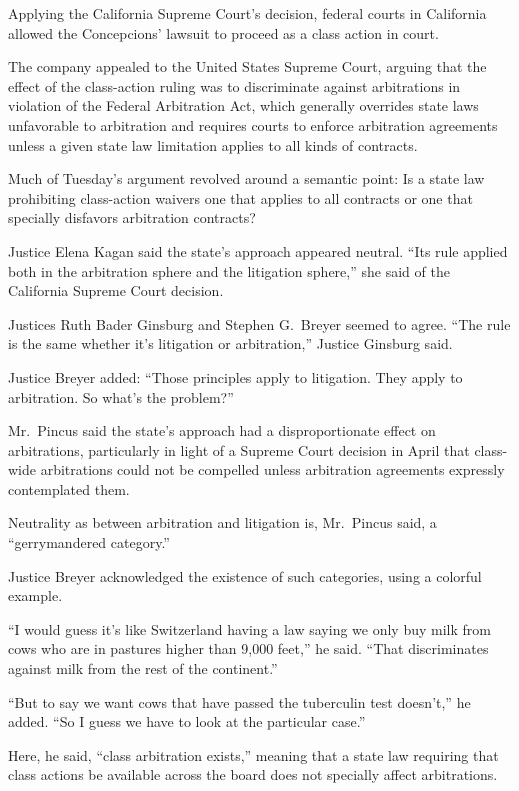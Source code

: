 ﻿\documentclass[12pt]{article}
\begin{document}
Applying the California Supreme Court's decision, federal courts in California allowed the
Concepcions' lawsuit to proceed as a class action in court.

The company appealed to the United States Supreme Court, arguing that the effect of the class-action
ruling was to discriminate against arbitrations in violation of the Federal Arbitration Act, which
generally overrides state laws unfavorable to arbitration and requires courts to enforce arbitration
agreements unless a given state law limitation applies to all kinds of contracts.

Much of Tuesday's argument revolved around a semantic point: Is a state law prohibiting class-action
waivers one that applies to all contracts or one that specially disfavors arbitration contracts?

Justice Elena Kagan said the state's approach appeared neutral. ``Its rule applied both in the
arbitration sphere and the litigation sphere,'' she said of the California Supreme Court decision.

Justices Ruth Bader Ginsburg and Stephen G.~Breyer seemed to agree. ``The rule is the same whether
it's litigation or arbitration,'' Justice Ginsburg said.

Justice Breyer added: ``Those principles apply to litigation. They apply to arbitration. So what's
the problem?''

Mr.~Pincus said the state's approach had a disproportionate effect on arbitrations, particularly in
light of a Supreme Court decision in April that class-wide arbitrations could not be compelled
unless arbitration agreements expressly contemplated them.

Neutrality as between arbitration and litigation is, Mr.~Pincus said, a ``gerrymandered category.''

Justice Breyer acknowledged the existence of such categories, using a colorful example.

``I would guess it's like Switzerland having a law saying we only buy milk from cows who are in
pastures higher than 9,000 feet,'' he said. ``That discriminates against milk from the rest of the
continent.''

``But to say we want cows that have passed the tuberculin test doesn't,'' he added. ``So I guess we
have to look at the particular case.''

Here, he said, ``class arbitration exists,'' meaning that a state law requiring that class actions
be available across the board does not specially affect arbitrations.
\end{document}
